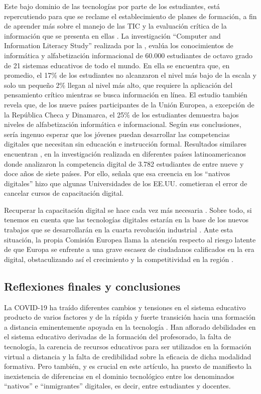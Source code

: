 \documentclass[spanish]{textolivre}
\begin{document}
Este bajo dominio de las tecnologías por parte de los estudiantes, está repercutiendo para que se reclame el establecimiento de planes de formación, a fin de aprender más sobre el manejo de las TIC y la evaluación crítica de la información que se presenta en ellas \cite{vsorgo2017attributes}. La investigación “Computer and Information Literacy Study” realizada por la \textcite{international2014}, evalúa los conocimientos de informática y alfabetización informacional de 60.000 estudiantes de octavo grado de 21 sistemas educativos de todo el mundo. En ella se encuentra que, en promedio, el 17\% de los estudiantes no alcanzaron el nivel más bajo de la escala y solo un pequeño 2\% llegan al nivel más alto, que requiere la aplicación del pensamiento crítico mientras se busca información en línea. El estudio también revela que, de los nueve países participantes de la Unión Europea, a excepción de la República Checa y Dinamarca, el 25\% de los estudiantes demuestra bajos niveles de alfabetización informática e informacional. Según sus conclusiones, sería ingenuo esperar que los jóvenes puedan desarrollar las competencias digitales que necesitan sin educación e instrucción formal. Resultados similares encuentran \textcite{garcia-ruiz_alfabetizacion_2020}, en la investigación realizada en diferentes países latinoamericanos donde analizaron la competencia digital de 3.782 estudiantes de entre nueve y doce años de siete países. Por ello, \textcite{denholm} señala que esa creencia en los “nativos digitales” hizo que algunas Universidades de los EE.UU. cometieran el error de cancelar cursos de capacitación digital.

Recuperar la capacitación digital se hace cada vez más necesaria \cite{calatayud2018formacion}. Sobre todo, si tenemos en cuenta que las tecnologías digitales estarán en la base de los nuevos trabajos que se desarrollarán en la cuarta revolución industrial \cite{oppenheimer_s?lvese_2018}. Ante esta situación, la propia Comisión Europea llama la atención respecto al riesgo latente de que Europa se enfrente a una grave escasez de ciudadanos calificados en la era digital, obstaculizando así el crecimiento y la competitividad en la región \cite{EuropeanCommission}.


\subsection{Reflexiones finales y conclusiones}

La COVID-19 ha traído diferentes cambios y tensiones en el sistema educativo producto de varios factores y de la rápida y fuerte transición hacia una formación a distancia eminentemente apoyada en la tecnología \cite{garcia_aretio_covid-19_2020}. Han aflorado debilidades en el sistema educativo derivadas de la formación del profesorado, la falta de tecnología, la carencia de recursos educativos para ser utilizados en la formación virtual a distancia y la falta de credibilidad sobre la eficacia de dicha modalidad formativa. Pero también, y es crucial en este artículo, ha puesto de manifiesto la inexistencia de diferencias en el dominio tecnológico entre los denominados “nativos” e “inmigrantes” digitales, es decir, entre estudiantes y docentes.
\end{document}
